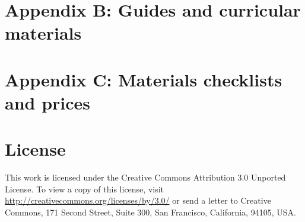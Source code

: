 \documentclass[11pt]{report}
\begin{document}
\chapter*{Appendix B: Guides and curricular materials}


\chapter*{Appendix C: Materials checklists and prices}



\nocite{*}
{\small


}

\chapter*{License}

This work is licensed under the Creative Commons Attribution 3.0 Unported License. To view a copy of this license, visit \url{http://creativecommons.org/licenses/by/3.0/} or send a letter to Creative Commons, 171 Second Street, Suite 300, San Francisco, California, 94105, USA.
\end{document}
